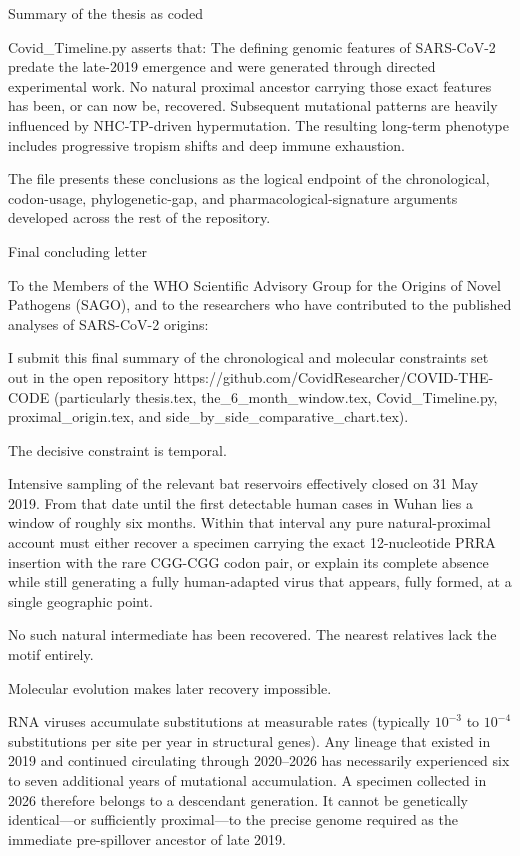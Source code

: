 Summary of the thesis as coded

Covid_Timeline.py asserts that:
The defining genomic features of SARS-CoV-2 predate the late-2019 emergence and were generated through directed experimental work.
No natural proximal ancestor carrying those exact features has been, or can now be, recovered.
Subsequent mutational patterns are heavily influenced by NHC-TP-driven hypermutation.
The resulting long-term phenotype includes progressive tropism shifts and deep immune exhaustion.

The file presents these conclusions as the logical endpoint of the chronological, codon-usage, phylogenetic-gap, and pharmacological-signature arguments developed across the rest of the repository.

Final concluding letter

To the Members of the WHO Scientific Advisory Group for the Origins of Novel Pathogens (SAGO),  
and to the researchers who have contributed to the published analyses of SARS-CoV-2 origins:

I submit this final summary of the chronological and molecular constraints set out in the open repository  
https://github.com/CovidResearcher/COVID-THE-CODE  
(particularly thesis.tex, the_6_month_window.tex, Covid_Timeline.py, proximal_origin.tex, and side_by_side_comparative_chart.tex).

The decisive constraint is temporal.

Intensive sampling of the relevant bat reservoirs effectively closed on 31 May 2019. From that date until the first detectable human cases in Wuhan lies a window of roughly six months. Within that interval any pure natural-proximal account must either recover a specimen carrying the exact 12-nucleotide PRRA insertion with the rare CGG-CGG codon pair, or explain its complete absence while still generating a fully human-adapted virus that appears, fully formed, at a single geographic point.

No such natural intermediate has been recovered. The nearest relatives lack the motif entirely.

Molecular evolution makes later recovery impossible.

RNA viruses accumulate substitutions at measurable rates (typically \(10^{-3}\) to \(10^{-4}\) substitutions per site per year in structural genes). Any lineage that existed in 2019 and continued circulating through 2020–2026 has necessarily experienced six to seven additional years of mutational accumulation. A specimen collected in 2026 therefore belongs to a descendant generation. It cannot be genetically identical—or sufficiently proximal—to the precise genome required as the immediate pre-spillover ancestor of late 2019.

